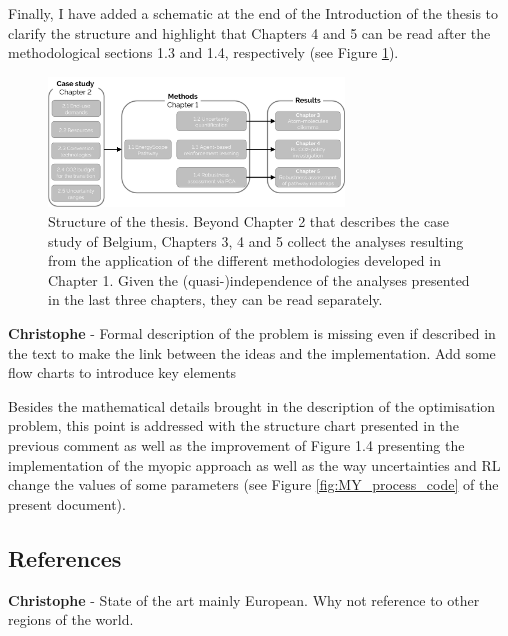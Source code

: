 \documentclass[12pt,a4paper]{article}
\begin{document}
\noindent Finally, I have added a schematic at the end of the Introduction of the thesis to clarify the structure and highlight that Chapters 4 and 5 can be read after the methodological sections 1.3 and 1.4, respectively (see Figure \ref{fig:intro:Thesis_Structure}).

\begin{figure}[htbp!]
\centering
\includegraphics[width=0.7\textwidth]{Thesis_Structure.pdf}
\caption{Structure of the thesis. Beyond Chapter 2 that describes the case study of Belgium, Chapters 3, 4 and 5 collect the analyses resulting from the application of the different methodologies developed in Chapter 1. Given the (quasi-)independence of the analyses presented in the last three chapters, they can be read separately.}
\label{fig:intro:Thesis_Structure}
\end{figure}


\begin{mdframed}[style=comment] %
{\color{violet} \textbf{Christophe}} - Formal description of the problem is missing even if described in the text to make the link between the ideas and the implementation. Add some flow charts to introduce key elements
\end{mdframed}

\noindent Besides the mathematical details brought in the description of the optimisation problem, this point is addressed with the structure chart presented in the previous comment as well as the improvement of Figure 1.4 presenting the implementation of the myopic approach as well as the way uncertainties and RL change the values of some parameters (see Figure \ref{fig:MY_process_code} of the present document).

\subsection{References}
\label{references}

\begin{mdframed}[style=comment] %
{\color{violet} \textbf{Christophe}} - State of the art mainly European. Why not reference to other regions of the world.
\end{mdframed}
\end{document}
